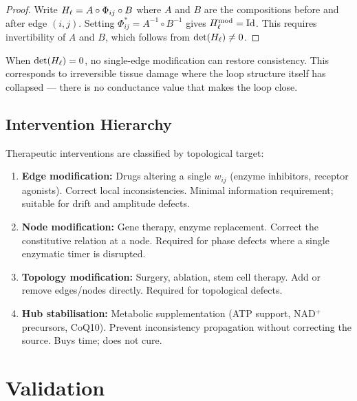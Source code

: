 \begin{proof}
Write $H_\ell = A \circ \Phi_{ij} \circ B$ where $A$ and $B$ are the
compositions before and after edge $(i,j)$.  Setting
$\Phi_{ij}^{*} = A^{-1} \circ B^{-1}$ gives
$H_\ell^{\mathrm{mod}} = \mathrm{Id}$.  This requires invertibility of
$A$ and $B$, which follows from $\det(H_\ell) \neq 0$.
\end{proof}

\begin{corollary}
\label{cor:irreversible}
When $\det(H_\ell) = 0$, no single-edge modification can restore consistency.
This corresponds to irreversible tissue damage where the loop structure
itself has collapsed --- there is no conductance value that makes the loop
close.
\end{corollary}

\subsection{Intervention Hierarchy}

Therapeutic interventions are classified by topological target:
\begin{enumerate}[label=(\roman*), itemsep=2pt]
  \item \textbf{Edge modification:} Drugs altering a single $w_{ij}$
        (enzyme inhibitors, receptor agonists).  Correct local
        inconsistencies.  Minimal information requirement; suitable for
        drift and amplitude defects.
  \item \textbf{Node modification:} Gene therapy, enzyme replacement.
        Correct the constitutive relation at a node.  Required for
        phase defects where a single enzymatic timer is disrupted.
  \item \textbf{Topology modification:} Surgery, ablation, stem cell
        therapy.  Add or remove edges/nodes directly.  Required for
        topological defects.
  \item \textbf{Hub stabilisation:} Metabolic supplementation (ATP support,
        NAD$^+$ precursors, CoQ10).  Prevent inconsistency propagation
        without correcting the source.  Buys time; does not cure.
\end{enumerate}


\section{Validation}
\label{sec:ch08-validation}

